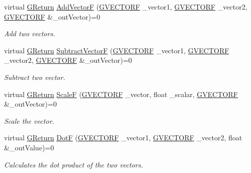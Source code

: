 \begin{DoxyCompactItemize}
\item 
virtual \mbox{\hyperlink{namespaceGW_a67a839e3df7ea8a5c5686613a7a3de21}{G\+Return}} \mbox{\hyperlink{classGW_1_1MATH_1_1GVector_abed6b09d9bab25de229a16015899d682}{Add\+VectorF}} (\mbox{\hyperlink{structGW_1_1MATH_1_1GVECTORF}{G\+V\+E\+C\+T\+O\+RF}} \+\_\+vector1, \mbox{\hyperlink{structGW_1_1MATH_1_1GVECTORF}{G\+V\+E\+C\+T\+O\+RF}} \+\_\+vector2, \mbox{\hyperlink{structGW_1_1MATH_1_1GVECTORF}{G\+V\+E\+C\+T\+O\+RF}} \&\+\_\+out\+Vector)=0
\begin{DoxyCompactList}\small\item\em Add two vectors. \end{DoxyCompactList}\item 
virtual \mbox{\hyperlink{namespaceGW_a67a839e3df7ea8a5c5686613a7a3de21}{G\+Return}} \mbox{\hyperlink{classGW_1_1MATH_1_1GVector_af8f13c5379e21d4e569f476032d97518}{Subtract\+VectorF}} (\mbox{\hyperlink{structGW_1_1MATH_1_1GVECTORF}{G\+V\+E\+C\+T\+O\+RF}} \+\_\+vector1, \mbox{\hyperlink{structGW_1_1MATH_1_1GVECTORF}{G\+V\+E\+C\+T\+O\+RF}} \+\_\+vector2, \mbox{\hyperlink{structGW_1_1MATH_1_1GVECTORF}{G\+V\+E\+C\+T\+O\+RF}} \&\+\_\+out\+Vector)=0
\begin{DoxyCompactList}\small\item\em Subtract two vector. \end{DoxyCompactList}\item 
virtual \mbox{\hyperlink{namespaceGW_a67a839e3df7ea8a5c5686613a7a3de21}{G\+Return}} \mbox{\hyperlink{classGW_1_1MATH_1_1GVector_a91373ccef519452b52c2b820f312d494}{ScaleF}} (\mbox{\hyperlink{structGW_1_1MATH_1_1GVECTORF}{G\+V\+E\+C\+T\+O\+RF}} \+\_\+vector, float \+\_\+scalar, \mbox{\hyperlink{structGW_1_1MATH_1_1GVECTORF}{G\+V\+E\+C\+T\+O\+RF}} \&\+\_\+out\+Vector)=0
\begin{DoxyCompactList}\small\item\em Scale the vector. \end{DoxyCompactList}\item 
virtual \mbox{\hyperlink{namespaceGW_a67a839e3df7ea8a5c5686613a7a3de21}{G\+Return}} \mbox{\hyperlink{classGW_1_1MATH_1_1GVector_aaa041109e606595189932719588e0141}{DotF}} (\mbox{\hyperlink{structGW_1_1MATH_1_1GVECTORF}{G\+V\+E\+C\+T\+O\+RF}} \+\_\+vector1, \mbox{\hyperlink{structGW_1_1MATH_1_1GVECTORF}{G\+V\+E\+C\+T\+O\+RF}} \+\_\+vector2, float \&\+\_\+out\+Value)=0
\begin{DoxyCompactList}\small\item\em Calculates the dot product of the two vectors. \end{DoxyCompactList}\item 

\end{DoxyCompactItemize}
